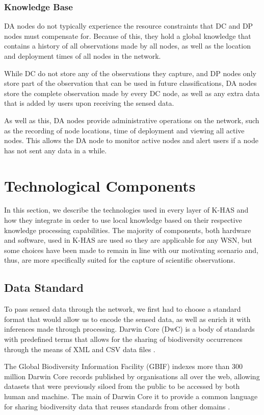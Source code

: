 	\subsubsection{Knowledge Base}
	DA nodes do not typically experience the resource constraints that DC and DP nodes must compensate for. Because of this, they hold a global knowledge that contains a history of all observations made by all nodes, as well as the location and deployment times of all nodes in the network.
	
	While DC do not store any of the observations they capture, and DP nodes only store part of the observation that can be used in future classifications, DA nodes store the complete observation made by every DC node, as well as any extra data that is added by users upon receiving the sensed data.
	
	As well as this, DA nodes provide administrative operations on the network, such as the recording of node locations, time of deployment and viewing all active nodes. This allows the DA node to monitor active nodes and alert users if a node has not sent any data in a while.
	
	
	\section{Technological Components}
	In this section, we describe the technologies used in every layer of K-HAS and how they integrate in order to use local knowledge based on their respective knowledge processing capabilities. The majority of components, both hardware and software, used in K-HAS are used so they are applicable for any WSN, but some choices have been made to remain in line with our motivating scenario and, thus, are more specifically suited for the capture of scientific observations.
	
	\subsection{Data Standard}
		To pass sensed data through the network, we first had to choose a standard format that would allow us to encode the sensed data, as well as enrich it with inferences made through processing. Darwin Core (DwC) is a body of standards with predefined terms that allows for the sharing of biodiversity occurrences through the means of XML and CSV data files \cite{Wieczorek2012b}.

The Global Biodiversity Information Facility (GBIF) indexes more than 300 million Darwin Core records published by organisations all over the web, allowing datasets that were previously siloed from the public to be accessed by both human and machine. The main of Darwin Core it to provide a common language for sharing biodiversity data that reuses standards from other domains \cite{Wieczorek2012a}.

